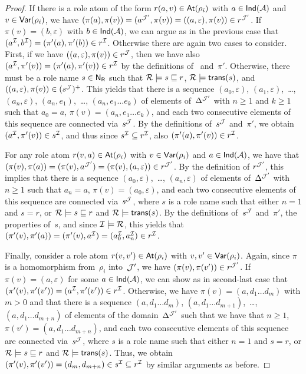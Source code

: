 \begin{proof}
    If there is a role atom of the form $r(a,v)\in\operatorname{\mathsf{At}}(\rho_i)$ with
    $a\in\mathsf{Ind}(\mathcal{A})$ and $v\in\operatorname{\mathsf{Var}}(\rho_i)$, we have
    $(\pi(a),\pi(v))=(a^{\mathcal{J}'},\pi(v))=((a,\varepsilon),\pi(v))\in r^{\mathcal{J}'}$.
    If $\pi(v)=(b,\varepsilon)$ with $b\in\mathsf{Ind}(\mathcal{A})$, we can argue as in the
    previous case that $(a^\mathcal{I},b^\mathcal{I})=(\pi'(a),\pi'(b))\in r^\mathcal{I}$.  Otherwise
    there are again two cases to consider.
    First, if we have $((a,\varepsilon),\pi(v))\in r^\mathcal{J}$, then we have also
    $(a^\mathcal{I},\pi'(v))=(\pi'(a),\pi'(v))\in r^\mathcal{I}$ by the definitions of~\Jmc
    and~$\pi'$.  Otherwise, there must be a role name $s\in\mathsf{N_R}$ such that
    $\mathcal{R}\models s\sqsubseteq r$, $\mathcal{R}\models\mathsf{trans}(s)$, and
    $((a,\varepsilon),\pi(v))\in(s^\mathcal{J})^+$.  This yields that there is a
    sequence $(a_0,\varepsilon)$, $(a_1,\varepsilon)$,~\dots,
    $(a_n,\varepsilon)$, $(a_n,e_1)$,~\dots, $(a_n,e_1\dots e_k)$ of elements
    of~$\Delta^{\mathcal{J}'}$ with $n\ge 1$ and $k\ge 1$ such that $a_0=a$,
    $\pi(v)=(a_n,e_1\dots e_k)$, and each two consecutive elements of this
    sequence are connected via~$s^\mathcal{J}$.  By the definitions of~$s^\mathcal{J}$
    and~$\pi'$, we obtain $(a^\mathcal{I},\pi'(v))\in s^\mathcal{I}$, and thus since
    $s^\mathcal{I}\subseteq r^\mathcal{I}$, also $(\pi'(a),\pi'(v))\in r^\mathcal{I}$.

    For any role atom $r(v,a)\in\operatorname{\mathsf{At}}(\rho_i)$ with $v\in\operatorname{\mathsf{Var}}(\rho_i)$ and
    $a\in\mathsf{Ind}(\mathcal{A})$, we have that
    $(\pi(v),\pi(a))=(\pi(v),a^{\mathcal{J}'})=(\pi(v),(a,\varepsilon))\in r^{\mathcal{J}'}$.
    By the definition of $r^{\mathcal{J}'}$, this implies that there is a sequence
    $(a_0,\varepsilon)$,~\dots, $(a_n,\varepsilon)$ of elements
    of~$\Delta^{\mathcal{J}'}$ with $n\ge 1$ such that $a_n=a$,
    $\pi(v)=(a_0,\varepsilon)$, and each two consecutive elements of this
    sequence are connected via~$s^\mathcal{J}$, where $s$ is a role name such that
    either $n=1$ and $s=r$, or $\mathcal{R}\models s\sqsubseteq r$ and
    $\mathcal{R}\models\mathsf{trans}(s)$.  By the definitions of~$s^\mathcal{J}$ and~$\pi'$, the
    properties of~$s$, and since $\mathcal{I}\models\mathcal{R}$, this yields that
    $(\pi'(v),\pi'(a))=(\pi'(v),a^\mathcal{I})=(a_0^\mathcal{I},a_n^\mathcal{I})\in r^\mathcal{I}$.

    Finally, consider a role atom $r(v,v')\in\operatorname{\mathsf{At}}(\rho_i)$ with
    $v,v'\in\operatorname{\mathsf{Var}}(\rho_i)$.  Again, since $\pi$ is a homomorphism from~$\rho_i$
    into~$\mathcal{J}'$, we have $(\pi(v),\pi(v'))\in r^{\mathcal{J}'}$.  If
    $\pi(v)=(a,\varepsilon)$ for some $a\in\mathsf{Ind}(\mathcal{A})$, we can show as in
    second-last case that $(\pi'(v),\pi'(v'))=(a^\mathcal{I},\pi'(v'))\in r^\mathcal{I}$.
    Otherwise, we have $\pi(v)=(a,d_1\dots d_m)$ with $m>0$ and that there is a
    sequence $(a,d_1\dots d_m)$, $(a,d_1\dots d_{m+1})$,~\dots,
    $(a,d_1\dots d_{m+n})$ of elements of the domain~$\Delta^{\mathcal{J}'}$ such that
    we have that $n\ge 1$, $\pi(v')=(a,d_1\dots d_{m+n})$, and each two
    consecutive elements of this sequence are connected via~$s^\mathcal{J}$, where $s$
    is a role name such that either $n=1$ and $s=r$, or
    $\mathcal{R}\models s\sqsubseteq r$ and $\mathcal{R}\models\mathsf{trans}(s)$.  Thus, we obtain
    $(\pi'(v),\pi'(v'))=(d_m,d_{m+n})\in s^\mathcal{I}\subseteq r^\mathcal{I}$ by similar
    arguments as before.


\end{proof}
